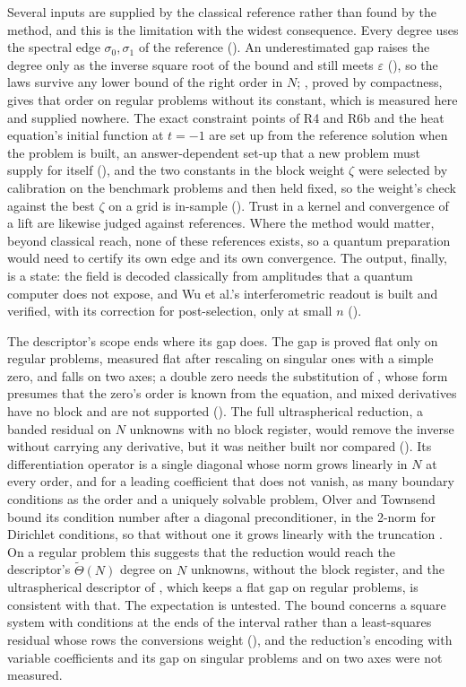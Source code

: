 Several inputs are supplied by the classical reference rather than found by the method, and this is the limitation with the widest consequence. Every degree uses the spectral edge $\sigma_0,\sigma_1$ of the reference (). An underestimated gap raises the degree only as the inverse square root of the bound and still meets $\varepsilon$ (), so the laws survive any lower bound of the right order in $N$; , proved by compactness, gives that order on regular problems without its constant, which is measured here and supplied nowhere. The exact constraint points of R4 and R6b and the heat equation's initial function at $t=-1$ are set up from the reference solution when the problem is built, an answer-dependent set-up that a new problem must supply for itself (), and the two constants in the block weight $\zeta$ were selected by calibration on the benchmark problems and then held fixed, so the weight's check against the best $\zeta$ on a grid is in-sample (). Trust in a kernel and convergence of a lift are likewise judged against references. Where the method would matter, beyond classical reach, none of these references exists, so a quantum preparation would need to certify its own edge and its own convergence. The output, finally, is a state: the field is decoded classically from amplitudes that a quantum computer does not expose, and Wu et al.'s interferometric readout is built and verified, with its correction for post-selection, only at small $n$ ().

The descriptor's scope ends where its gap does. The gap is proved flat only on regular problems, measured flat after rescaling on singular ones with a simple zero, and falls on two axes; a double zero needs the substitution of , whose form presumes that the zero's order is known from the equation, and mixed derivatives have no block and are not supported (). The full ultraspherical reduction, a banded residual on $N$ unknowns with no block register, would remove the inverse without carrying any derivative, but it was neither built nor compared (). Its differentiation operator is a single diagonal whose norm grows linearly in $N$ at every order, and for a leading coefficient that does not vanish, as many boundary conditions as the order and a uniquely solvable problem, Olver and Townsend bound its condition number after a diagonal preconditioner, in the 2-norm for Dirichlet conditions, so that without one it grows linearly with the truncation \cite{olver2013}. On a regular problem this suggests that the reduction would reach the descriptor's $\tilde\Theta(N)$ degree on $N$ unknowns, without the block register, and the ultraspherical descriptor of , which keeps a flat gap on regular problems, is consistent with that. The expectation is untested. The bound concerns a square system with conditions at the ends of the interval rather than a least-squares residual whose rows the conversions weight (), and the reduction's encoding with variable coefficients and its gap on singular problems and on two axes were not measured.

